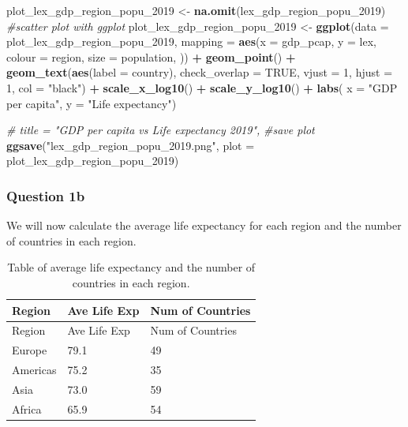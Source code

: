 \documentclass[
]{article}
\newenvironment{Shaded}{\begin{snugshade}}{\end{snugshade}}
\newcommand{\AttributeTok}[1]{\textcolor[rgb]{0.13,0.29,0.53}{#1}}
\newcommand{\CommentTok}[1]{\textcolor[rgb]{0.56,0.35,0.01}{\textit{#1}}}
\newcommand{\ConstantTok}[1]{\textcolor[rgb]{0.56,0.35,0.01}{#1}}
\newcommand{\DecValTok}[1]{\textcolor[rgb]{0.00,0.00,0.81}{#1}}
\newcommand{\FunctionTok}[1]{\textcolor[rgb]{0.13,0.29,0.53}{\textbf{#1}}}
\newcommand{\NormalTok}[1]{#1}
\newcommand{\OtherTok}[1]{\textcolor[rgb]{0.56,0.35,0.01}{#1}}
\newcommand{\SpecialCharTok}[1]{\textcolor[rgb]{0.81,0.36,0.00}{\textbf{#1}}}
\newcommand{\StringTok}[1]{\textcolor[rgb]{0.31,0.60,0.02}{#1}}
\begin{document}
\begin{Shaded}
\begin{Highlighting}[]
\NormalTok{plot\_lex\_gdp\_region\_popu\_2019 }\OtherTok{\textless{}{-}} \FunctionTok{na.omit}\NormalTok{(lex\_gdp\_region\_popu\_2019)}
\CommentTok{\#scatter plot with ggplot}
\NormalTok{plot\_lex\_gdp\_region\_popu\_2019 }\OtherTok{\textless{}{-}} \FunctionTok{ggplot}\NormalTok{(}\AttributeTok{data =}\NormalTok{ plot\_lex\_gdp\_region\_popu\_2019, }\AttributeTok{mapping =} \FunctionTok{aes}\NormalTok{(}\AttributeTok{x =}\NormalTok{ gdp\_pcap, }\AttributeTok{y =}\NormalTok{ lex,}
             \AttributeTok{colour =}\NormalTok{ region,}
             \AttributeTok{size =}\NormalTok{ population,}
\NormalTok{             )) }\SpecialCharTok{+}
  \FunctionTok{geom\_point}\NormalTok{() }\SpecialCharTok{+}
  \FunctionTok{geom\_text}\NormalTok{(}\FunctionTok{aes}\NormalTok{(}\AttributeTok{label =}\NormalTok{ country), }\AttributeTok{check\_overlap =} \ConstantTok{TRUE}\NormalTok{, }\AttributeTok{vjust =} \DecValTok{1}\NormalTok{, }\AttributeTok{hjust =} \DecValTok{1}\NormalTok{, }\AttributeTok{col =} \StringTok{"black"}\NormalTok{) }\SpecialCharTok{+}
  \FunctionTok{scale\_x\_log10}\NormalTok{() }\SpecialCharTok{+}
  \FunctionTok{scale\_y\_log10}\NormalTok{() }\SpecialCharTok{+}
  \FunctionTok{labs}\NormalTok{(}
       \AttributeTok{x =} \StringTok{"GDP per capita"}\NormalTok{,}
       \AttributeTok{y =} \StringTok{"Life expectancy"}\NormalTok{)}
  

  \CommentTok{\# title = "GDP per capita vs Life expectancy 2019",}
\CommentTok{\#save plot}
\FunctionTok{ggsave}\NormalTok{(}\StringTok{"lex\_gdp\_region\_popu\_2019.png"}\NormalTok{, }\AttributeTok{plot =}\NormalTok{ plot\_lex\_gdp\_region\_popu\_2019)}
\end{Highlighting}
\end{Shaded}

\hypertarget{question-1b}{%
\subsubsection{Question 1b}\label{question-1b}}

We will now calculate the average life expectancy for each region and
the number of countries in each region.

\begin{longtable}[]{@{}lll@{}}
\caption{Table of average life expectancy and the number of countries in
each region.}\tabularnewline
\toprule\noalign{}
Region & Ave Life Exp & Num of Countries \\
\midrule\noalign{}
\endfirsthead
\toprule\noalign{}
Region & Ave Life Exp & Num of Countries \\
\midrule\noalign{}
\endhead
\bottomrule\noalign{}
\endlastfoot
Europe & 79.1 & 49 \\
Americas & 75.2 & 35 \\
Asia & 73.0 & 59 \\
Africa & 65.9 & 54 \\
\end{longtable}
\end{document}
